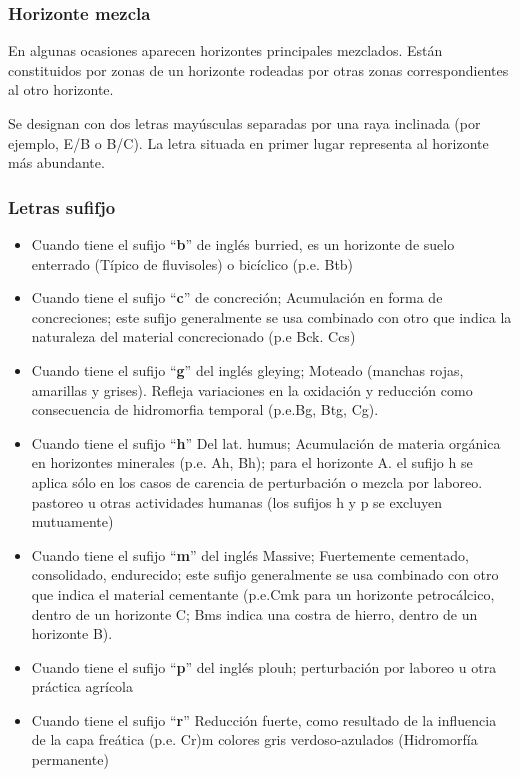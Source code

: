 \subsubsection{Horizonte mezcla}
En algunas ocasiones aparecen horizontes principales mezclados. Están constituidos por zonas de un horizonte rodeadas por otras zonas correspondientes al otro horizonte.

Se designan con dos letras mayúsculas separadas por una raya inclinada (por ejemplo, E/B o B/C). La letra situada en primer lugar representa al horizonte más abundante.

\subsubsection{Letras sufifjo}

\begin{itemize}
    \item Cuando tiene el sufijo ``\textbf{b}'' de inglés burried, es un horizonte de suelo enterrado (Típico de fluvisoles) o bicíclico (p.e. Btb)
    \item Cuando tiene el sufijo ``\textbf{c}'' de concreción; Acumulación en forma de concreciones; este sufijo generalmente se usa combinado con otro que indica la naturaleza del material concrecionado (p.e Bck. Ccs)
    \item Cuando tiene el sufijo ``\textbf{g}'' del inglés gleying; Moteado (manchas rojas, amarillas y grises). Refleja variaciones en la oxidación y reducción como consecuencia de hidromorfia temporal (p.e.Bg, Btg, Cg).
    \item Cuando tiene el sufijo ``\textbf{h}'' Del lat. humus; Acumulación de materia orgánica en horizontes minerales (p.e. Ah, Bh); para el horizonte A. el sufijo h se aplica sólo en los casos de carencia de perturbación o mezcla por laboreo. pastoreo u otras actividades humanas (los sufijos h y p se excluyen mutuamente)
    \item Cuando tiene el sufijo ``\textbf{m}'' del inglés Massive; Fuertemente cementado, consolidado, endurecido; este sufijo generalmente se usa combinado con otro que indica el material cementante (p.e.Cmk para un horizonte petrocálcico, dentro de un horizonte C; Bms indica una costra de hierro, dentro de un horizonte B).
    \item Cuando tiene el sufijo ``\textbf{p}'' del inglés plouh; perturbación por laboreo u otra práctica agrícola
    \item Cuando tiene el sufijo ``\textbf{r}'' Reducción fuerte, como resultado de la influencia de la capa freática (p.e. Cr)m colores gris verdoso-azulados (Hidromorfía permanente)

\end{itemize}
